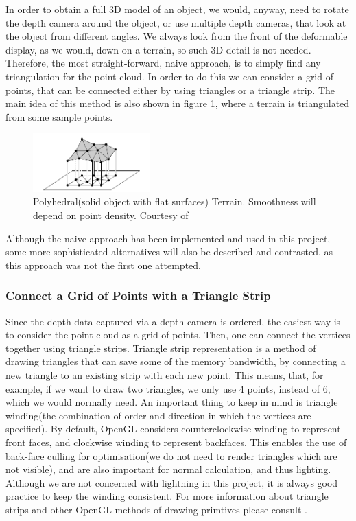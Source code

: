 \documentclass[]{article}
\begin{document}
In order to obtain a full 3D model of an object, we would, anyway, need to rotate the depth camera around the object, or use multiple depth cameras, that look at the object from different angles. We always look from the front of the deformable display, as we would, down on a terrain, so such 3D detail is not needed. Therefore, the most straight-forward, naive approach, is to simply find any triangulation for the point cloud. In order to do this we can consider a grid of points, that can be connected either by using triangles or a triangle strip. The main idea of this method is also shown in figure \ref{fig:PolyhedralTerrain.PNG}, where a terrain is triangulated from some sample points.

\begin{figure}[hbtp]
    \centering
    \includegraphics[width=0.4\textwidth]{figures/PolyhedralTerrain.PNG}
    \caption{Polyhedral(solid object with flat surfaces) Terrain. Smoothness will depend on point density. Courtesy of \cite[Chapter~9]{berg08}}
    \label{fig:PolyhedralTerrain.PNG}
\end{figure}

Although the naive approach has been implemented and used in this project, some more sophisticated alternatives will also be described and contrasted, as this approach was not the first one attempted.

\subsubsection{Connect a Grid of Points with a Triangle Strip}
\label{sec:TriangleStripTriangulation}
Since the depth data captured via a depth camera is ordered, the easiest way is to consider the point cloud as a grid of points. Then, one can connect the vertices together using triangle strips. Triangle strip representation is a method of drawing triangles that can save some of the memory bandwidth, by connecting a new triangle to an existing strip with each new point. This means, that, for example, if we want to draw two triangles, we only use 4 points, instead of 6, which we would normally need. An important thing to keep in mind is triangle winding(the combination of order and direction in which the vertices are specified). By default, OpenGL considers counterclockwise winding to represent front faces, and clockwise winding to represent backfaces. This enables the use of back-face culling for optimisation(we do not need to render triangles which are not visible), and are also important for normal calculation, and thus lighting. Although we are not concerned with lightning in this project, it is always good practice to keep the winding consistent. For more information about triangle strips and other OpenGL methods of drawing primtives please consult \cite[Chapter~3]{superbible}.
\end{document}
